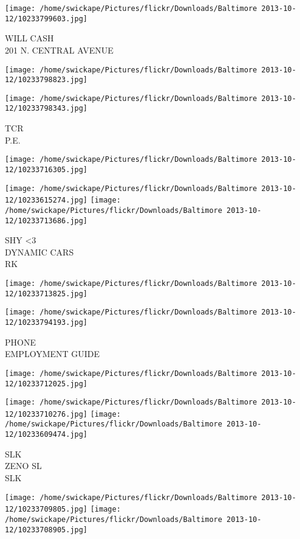 \documentclass[10pt,letterpaper]{article}
\begin{document}
\vspace{0.25in}
\texttt{[image: /home/swickape/Pictures/flickr/Downloads/Baltimore 2013-10-12/10233799603.jpg]}

WILL CASH\\
201 N. CENTRAL AVENUE
\pagebreak

\texttt{[image: /home/swickape/Pictures/flickr/Downloads/Baltimore 2013-10-12/10233798823.jpg]}

\vspace{0.25in}
\texttt{[image: /home/swickape/Pictures/flickr/Downloads/Baltimore 2013-10-12/10233798343.jpg]}

TCR\\
P.E.
\pagebreak

\texttt{[image: /home/swickape/Pictures/flickr/Downloads/Baltimore 2013-10-12/10233716305.jpg]}

\vspace{0.25in}
\texttt{[image: /home/swickape/Pictures/flickr/Downloads/Baltimore 2013-10-12/10233615274.jpg]}
\texttt{[image: /home/swickape/Pictures/flickr/Downloads/Baltimore 2013-10-12/10233713686.jpg]}

SHY <3\\
DYNAMIC CARS\\
RK
\pagebreak

\texttt{[image: /home/swickape/Pictures/flickr/Downloads/Baltimore 2013-10-12/10233713825.jpg]}

\vspace{0.25in}
\texttt{[image: /home/swickape/Pictures/flickr/Downloads/Baltimore 2013-10-12/10233794193.jpg]}

PHONE\\
EMPLOYMENT GUIDE
\pagebreak

\texttt{[image: /home/swickape/Pictures/flickr/Downloads/Baltimore 2013-10-12/10233712025.jpg]}

\vspace{0.25in}
\texttt{[image: /home/swickape/Pictures/flickr/Downloads/Baltimore 2013-10-12/10233710276.jpg]}
\texttt{[image: /home/swickape/Pictures/flickr/Downloads/Baltimore 2013-10-12/10233609474.jpg]}

SLK\\
ZENO SL\\
SLK
\pagebreak

\texttt{[image: /home/swickape/Pictures/flickr/Downloads/Baltimore 2013-10-12/10233709805.jpg]}
\texttt{[image: /home/swickape/Pictures/flickr/Downloads/Baltimore 2013-10-12/10233708905.jpg]}
\end{document}
